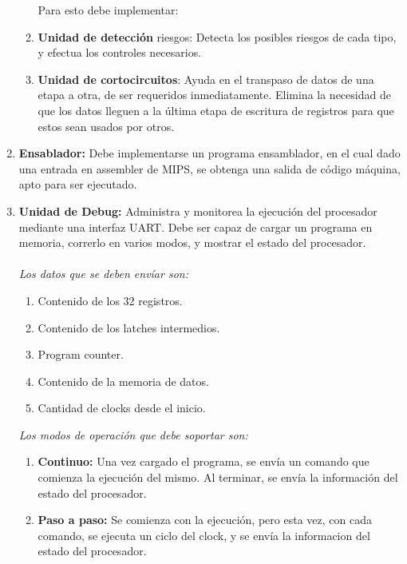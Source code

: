 \documentclass[12pt]{article}
\begin{document}
\begin{enumerate}
\begin{enumerate}
    Para esto debe implementar:
    \item \textbf{Unidad de detección} riesgos: Detecta los posibles riesgos de cada tipo, y efectua los controles necesarios.
    \item \textbf{Unidad de cortocircuitos}: Ayuda en el transpaso de datos de una etapa a otra, de ser requeridos inmediatamente. Elimina la necesidad de que los datos lleguen a la última etapa de escritura de registros para que estos sean usados por otros.
  \end{enumerate}
      \item \textbf{Ensablador:} Debe implementarse un programa ensamblador, en el cual dado una entrada en assembler de MIPS, se obtenga una salida de código máquina, apto para ser ejecutado.
      \item \textbf{Unidad de Debug:} Administra y monitorea la ejecución del procesador mediante una interfaz UART. Debe ser capaz de cargar un programa en memoria, correrlo en varios modos, y mostrar el estado del procesador. \\ \\
      \textit{Los datos que se deben envíar son:} \\
      \begin{enumerate}
        \item Contenido de los 32 registros.
        \item Contenido de los latches intermedios.
        \item Program counter.
        \item Contenido de la memoria de datos.
        \item Cantidad de clocks desde el inicio. \\
      \end{enumerate}
      \textit{Los modos de operación que debe soportar son:} \\

      \begin{enumerate}
        \item \textbf{Continuo:} Una vez cargado el programa, se envía un comando que comienza la ejecución del mismo. Al terminar, se envía la información del estado del procesador.
        \item \textbf{Paso a paso:} Se comienza con la ejecución, pero esta vez, con cada comando, se ejecuta un ciclo del clock, y se envía la informacion del estado del procesador. \\
      \end{enumerate}


\end{enumerate}
\end{document}

